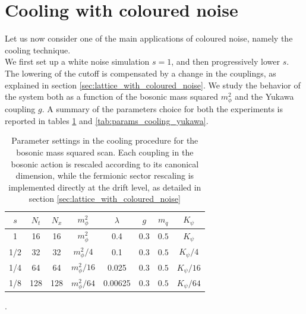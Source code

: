 \section{Cooling with coloured noise}
Let us now consider one of the main applications of coloured noise, namely the cooling technique. \\
We first set up a white noise simulation $s=1$, and then progressively lower $s$. The lowering of the cutoff is compensated by a change in the couplings, as explained in section \ref{sec:lattice_with_coloured_noise}. 
We study the behavior of the system both as a function of the bosonic mass squared $m_\phi^2$ and the Yukawa coupling $g$. 
A summary of the parameters choice for both the experiments is reported in tables \ref{tab:params_cooling} and \ref{tab:params_cooling_yukawa}.
\begin{table}[htp]
    \centering
    \begin{tabular}{cccccccc}
        \toprule
        $s$ & $N_t$ & $N_x$ & $m_\phi^2$ & $\lambda$ & $g$ & $m_q$& $K_\psi$ \\
        \midrule 
        1 & 16 & 16 & $m_\phi^2$ & 0.4 & 0.3 & $0.5$ & $K_\psi$ \\
        1/2 & 32 & 32 & $m_\phi^2/4$ & 0.1 & 0.3 & $0.5$ & $K_\psi/4$ \\
        1/4 & 64 & 64 & $m_\phi^2/16$ & 0.025 & 0.3 & $0.5$ & $K_\psi/16$ \\
        1/8 & 128 & 128 & $m_\phi^2/64$ & 0.00625 & 0.3 & $0.5$ & $K_\psi/64$ \\
        \bottomrule
    \end{tabular}
    \caption[Parameter settings in the cooling procedure for the Bosonic mass squared scan]{Parameter settings in the cooling procedure for the bosonic mass squared scan. Each coupling in the bosonic action is rescaled according to its canonical dimension, while the fermionic sector rescaling is implemented directly at the drift level, as detailed in section \ref{sec:lattice_with_coloured_noise}}.
    \label{tab:params_cooling}
\end{table}
